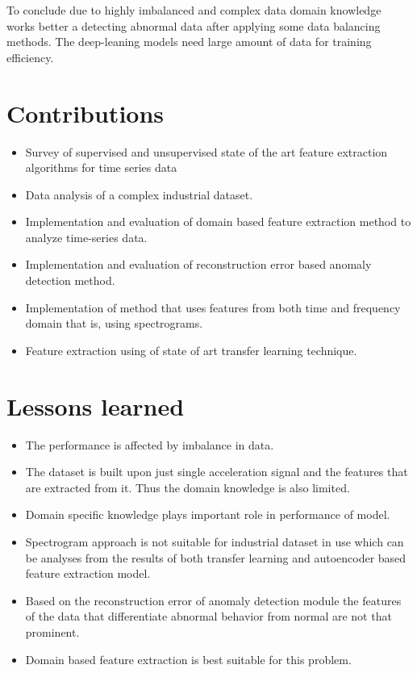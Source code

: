 To conclude due to highly imbalanced and complex data domain knowledge works better a detecting abnormal data after applying some data balancing methods. The deep-leaning models need large amount of data for training efficiency.
 



    \section{Contributions}
    \begin{itemize}
    \item Survey of supervised and unsupervised state of the art feature extraction algorithms for time series data
    \item Data analysis of a complex industrial dataset.
    \item Implementation and evaluation of domain based feature extraction method to analyze time-series data.
    \item Implementation and evaluation of reconstruction error based anomaly detection method.
    \item Implementation of method that uses features from both time and frequency domain that is, using spectrograms.
    \item Feature extraction using of state of art transfer learning technique.
    \end{itemize}
    
    
    \section{Lessons learned}
    \begin{itemize}
    	\item The performance is affected by imbalance in data.
    	\item The dataset is built upon just single acceleration signal and the features that are extracted from it. Thus the domain knowledge is also limited.
    	\item Domain specific knowledge plays important role in performance of model.
    	\item Spectrogram approach is not suitable for industrial dataset in use which can be analyses from the results of both transfer learning and autoencoder based feature extraction model.
    	\item Based on the reconstruction error of anomaly detection module the features of the data that differentiate abnormal behavior from normal are not that prominent.
    	\item Domain based feature extraction is best suitable for this problem.
    \end{itemize}

